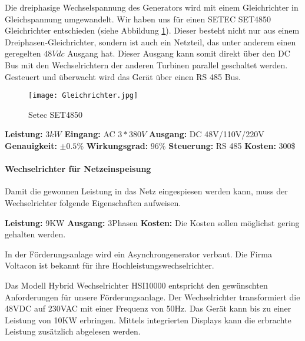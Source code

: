 Die dreiphasige Wechselspannung des Generators wird mit einem Gleichrichter in Gleichspannung umgewandelt. Wir haben uns für einen SETEC SET4850 Gleichrichter entschieden (siehe Abbildung \ref{fig:Gleichrichter}). Dieser besteht nicht nur aus einem Dreiphasen-Gleichrichter, sondern ist auch ein Netzteil, das unter anderem einen geregelten \(48Vdc\) Ausgang hat. Dieser Ausgang kann somit direkt über den DC Bus mit den Wechselrichtern der anderen Turbinen parallel geschaltet werden. Gesteuert und überwacht wird das Gerät über einen RS 485 Bus.

\begin{figure}[H]
\centering
\texttt{[image: Gleichrichter.jpg]}
\caption{Setec SET4850 \cite{gleichrichter}}
\label{fig:Gleichrichter}
\end{figure}

\textbf{Leistung:}		\(3 kW\) 			\newline
\textbf{Eingang:}		AC \(3 * 380V\) 	\newline
\textbf{Ausgang:}		DC 48V/110V/220V 	\newline
\textbf{Genauigkeit:}	\(\pm 0.5 \%\)		\newline
\textbf{Wirkungsgrad:}	\(96\%\) 			\newline
\textbf{Steuerung:}		RS 485 				\newline
\textbf{Kosten:}		300\$				\newline


\paragraph{Wechselrichter für Netzeinspeisung} \label{par:WechselrichterNetz}

Damit die gewonnen Leistung in das Netz eingespiesen werden kann, muss der Wechselrichter folgende Eigenschaften aufweisen. 

\textbf{Leistung:}		9KW \newline
\textbf{Ausgang:}		3Phasen \newline
\textbf{Kosten:}		Die Kosten sollen möglichst gering gehalten werden. \newline

In der Förderungsanlage wird ein Asynchrongenerator verbaut. Die Firma Voltacon ist bekannt für ihre Hochleistungswechselrichter.

Das Modell Hybrid Wechselrichter HSI10000 entspricht den gewünschten Anforderungen für unsere Förderungsanlage. Der Wechselrichter transformiert die 48VDC auf 230VAC mit einer Frequenz von 50\si{\hertz}. Das Gerät kann bis zu einer Leistung von 10KW erbringen. Mittels integrierten Displays kann die erbrachte Leistung zusätzlich abgelesen werden. 


